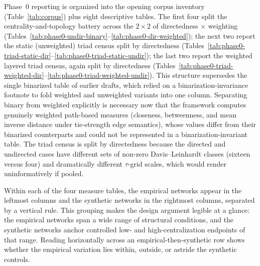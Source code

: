\documentclass[11pt]{article}
\begin{document}
Phase~0 reporting is organized into the opening corpus inventory (Table~\ref{tab:corpus}) plus eight descriptive tables. The first four split the centrality-and-topology battery across the $2 \times 2$ of directedness $\times$ weighting (Tables~\ref{tab:phase0-undir-binary}--\ref{tab:phase0-dir-weighted}); the next two report the static (unweighted) triad census split by directedness (Tables~\ref{tab:phase0-triad-static-dir}--\ref{tab:phase0-triad-static-undir}); the last two report the weighted layered triad census, again split by directedness (Tables~\ref{tab:phase0-triad-weighted-dir}--\ref{tab:phase0-triad-weighted-undir}). This structure supersedes the single binarized table of earlier drafts, which relied on a binarization-invariance footnote to fold weighted and unweighted variants into one column. Separating binary from weighted explicitly is necessary now that the framework computes genuinely weighted path-based measures (closeness, betweenness, and mean inverse distance under tie-strength edge semantics), whose values differ from their binarized counterparts and could not be represented in a binarization-invariant table. The triad census is split by directedness because the directed and undirected cases have different sets of non-zero Davis--Leinhardt classes (sixteen versus four) and dramatically different $\tau$-grid scales, which would render uninformatively if pooled.

Within each of the four measure tables, the empirical networks appear in the leftmost columns and the synthetic networks in the rightmost columns, separated by a vertical rule. This grouping makes the design argument legible at a glance: the empirical networks span a wide range of structural conditions, and the synthetic networks anchor controlled low- and high-centralization endpoints of that range. Reading horizontally across an empirical-then-synthetic row shows whether the empirical variation lies within, outside, or astride the synthetic controls.
\end{document}
